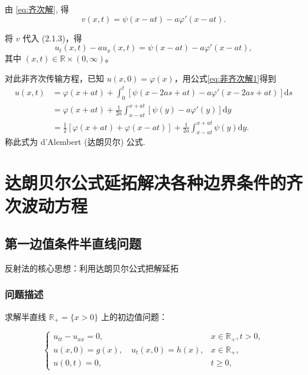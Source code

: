 \documentclass[12pt,a4paper]{article}
\numberwithin{subsection}{section}   %
\numberwithin{subsubsection}{subsection}
\theoremstyle{plain}
\theoremstyle{definition}
\theoremstyle{remark}
\theoremstyle{remark}
\begin{document}
	由 \eqref{eq:齐次解}, 得
	\begin{equation}
		v(x, t) = \psi(x - a t) - a \varphi'(x - a t).
	\end{equation}
	
	将 \(v\) 代入 (2.1.3)，得
	\begin{equation}
		u_t(x, t) - a u_x(x, t) = \psi(x - a t) - a \varphi'(x - a t),
	\end{equation}
	其中 \((x, t) \in \mathbb{R} \times (0, \infty)\)。
	
	对此非齐次传输方程，已知 \(u(x, 0) = \varphi(x)\)，用公式\eqref{eq:非齐次解1}得到
	\begin{equation}\label{eq:达朗贝尔公式}
		\begin{aligned}
			u(x, t) &= \varphi(x + a t) + \int_0^t \left[ \psi(x - 2 a s + a t) - a \varphi'(x - 2 a s + a t) \right] \mathrm{d}s \\
			&= \varphi(x + a t) + \frac{1}{2 a} \int_{x - a t}^{x + a t} \left[ \psi(y) - a \varphi'(y) \right] \mathrm{d}y \\
			&= \frac{1}{2} \left[ \varphi(x + a t) + \varphi(x - a t) \right] + \frac{1}{2 a} \int_{x - a t}^{x + a t} \psi(y) \mathrm{d}y.
		\end{aligned}
	\end{equation}
	称此式为 d'Alembert (达朗贝尔) 公式.
	
	
	\newpage
	
	\section{达朗贝尔公式延拓解决各种边界条件的齐次波动方程}
	\subsection{第一边值条件半直线问题}
	反射法的核心思想：利用达朗贝尔公式把解延拓
	
	\subsubsection{问题描述}
	求解半直线 \(\mathbb{R}_+ = \{x > 0\}\) 上的初边值问题：
	
	\begin{equation}
		\begin{cases}
			u_{tt} - u_{xx} = 0, & x \in \mathbb{R}_+, t > 0, \\
			u(x, 0) = g(x), \quad u_t(x, 0) = h(x), & x \in \mathbb{R}_+, \\
			u(0, t) = 0, & t \geq 0,
		\end{cases}
	\end{equation}
	
\end{document}
